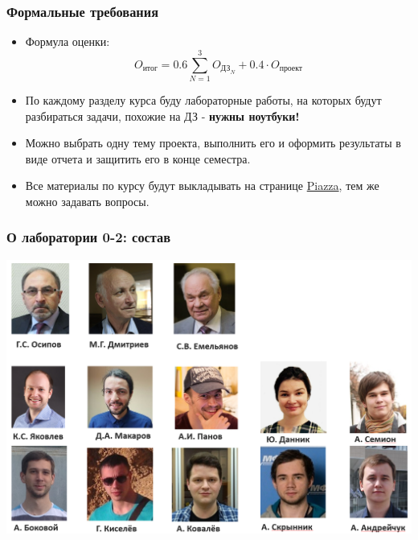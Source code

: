 \documentclass[12pt]{beamer}
\begin{document}
\begin{frame}
\frametitle{Формальные требования}
\begin{itemize}
	\item Формула оценки: \[O_{\text{итог}}=0.6\sum_{N=1}^3 O_{\text{ДЗ}_N}+0.4\cdot O_{\text{проект}}\]
	\item По каждому разделу курса буду лабораторные работы, на которых будут разбираться задачи, похожие на ДЗ - \textbf{нужны ноутбуки!}
	\item Можно выбрать одну тему проекта, выполнить его и оформить результаты в виде отчета и защитить его в конце семестра.
	\item Все материалы по курсу будут выкладывать на странице \href{https://piazza.com/class/jdd7dvwvvwv7kq}{Piazza}, тем же можно задавать вопросы.
\end{itemize}

\end{frame}

\begin{frame}
\frametitle{О лаборатории 0-2: состав}
	\includegraphics[width=1\linewidth]{lab02.png}
\end{frame}
\end{document}
